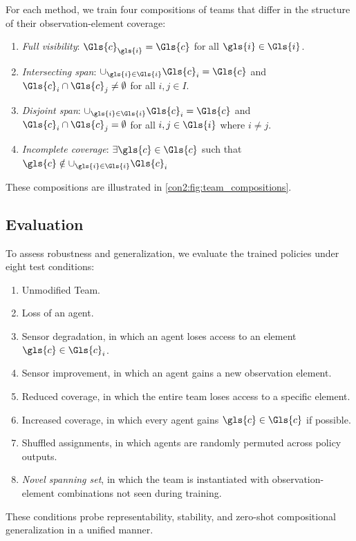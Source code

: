 \documentclass[]{jair}
\begin{document}
For each method, we train four compositions of teams that differ in the
structure of their observation-element coverage:
\begin{enumerate}
    \item \emph{Full visibility}: \(\Gls{c}_{\gls{i}} = \Gls{c}\) for all \(\gls{i} \in \Gls{i}\).
    \item \emph{Intersecting span}: \(\cup_{\gls{i} \in \Gls{i}} \Gls{c}_i = \Gls{c}\) and 
        \(\Gls{c}_i \cap \Gls{c}_j \neq \emptyset\) for all \(i,j\in I\).
    \item \emph{Disjoint span}: \(\cup_{\gls{i} \in \Gls{i}} \Gls{c}_i = \Gls{c}\) and 
        \(\Gls{c}_i \cap \Gls{c}_j = \emptyset\) for all  \(i,j\in \Gls{i}\) where \(i\neq j\).
    \item \emph{Incomplete coverage}: \(\exists \gls{c} \in \Gls{c}\) such that 
        \(\gls{c}\notin \cup_{\gls{i} \in \Gls{i}} \Gls{c}_i\)
\end{enumerate}
These compositions are illustrated in \cref{con2:fig:team_compositions}.

\subsection{Evaluation}

To assess robustness and generalization, we evaluate the trained policies
under eight test conditions:
\begin{enumerate}
    \item Unmodified Team.
    \item Loss of an agent.
    \item Sensor degradation, in which an agent loses access to an element \(\gls{c}\in\Gls{c}_i\).
    \item Sensor improvement, in which an agent gains a new observation element.
    \item Reduced coverage, in which the entire team loses access to a specific element.
    \item Increased coverage, in which every agent gains \(\gls{c}\in\Gls{c}\) if possible.
    \item Shuffled assignments, in which agents are randomly permuted across policy outputs.
    \item \emph{Novel spanning set}, in which the team is instantiated with
        observation-element combinations not seen during training.
\end{enumerate}
These conditions probe representability, stability, and zero-shot compositional
generalization in a unified manner.
\end{document}
